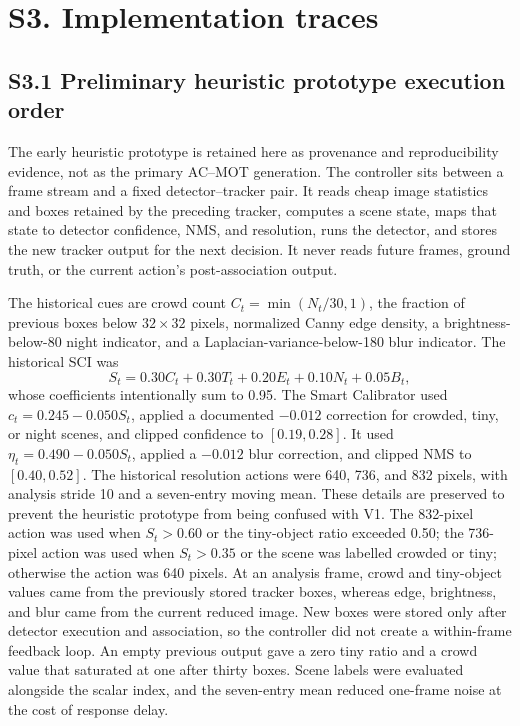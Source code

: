 \documentclass[11pt]{article}
\begin{document}
\section*{S3. Implementation traces}

\subsection*{S3.1 Preliminary heuristic prototype execution order}
The early heuristic prototype is retained here as provenance and reproducibility
evidence, not as the primary AC--MOT generation. The controller sits between a
frame stream and a fixed detector--tracker pair. It reads cheap image
statistics and boxes retained by the preceding tracker, computes a scene state,
maps that state to detector confidence, NMS, and resolution, runs the detector,
and stores the new tracker output for the next decision. It never reads future
frames, ground truth, or the current action's post-association output.

The historical cues are crowd count $C_t=\min(N_t/30,1)$, the fraction of
previous boxes below $32\times32$ pixels, normalized Canny edge density, a
brightness-below-80 night indicator, and a Laplacian-variance-below-180 blur
indicator. The historical SCI was
\begin{equation*}
S_t=0.30C_t+0.30T_t+0.20E_t+0.10N_t+0.05B_t,
\end{equation*}
whose coefficients intentionally sum to 0.95. The Smart Calibrator used
$c_t=0.245-0.050S_t$, applied a documented $-0.012$ correction for crowded,
tiny, or night scenes, and clipped confidence to $[0.19,0.28]$. It used
$\eta_t=0.490-0.050S_t$, applied a $-0.012$ blur correction, and clipped NMS
to $[0.40,0.52]$. The historical resolution actions were 640, 736, and 832
pixels, with analysis stride 10 and a seven-entry moving mean. These details
are preserved to prevent the heuristic prototype from being confused with V1.
The 832-pixel action was used when $S_t>0.60$ or the tiny-object ratio exceeded
0.50; the 736-pixel action was used when $S_t>0.35$ or the scene was labelled
crowded or tiny; otherwise the action was 640 pixels. At an analysis frame,
crowd and tiny-object values came from the previously stored tracker boxes,
whereas edge, brightness, and blur came from the current reduced image. New
boxes were stored only after detector execution and association, so the
controller did not create a within-frame feedback loop. An empty previous
output gave a zero tiny ratio and a crowd value that saturated at one after
thirty boxes. Scene labels were evaluated alongside the scalar index, and the
seven-entry mean reduced one-frame noise at the cost of response delay.
\end{document}
